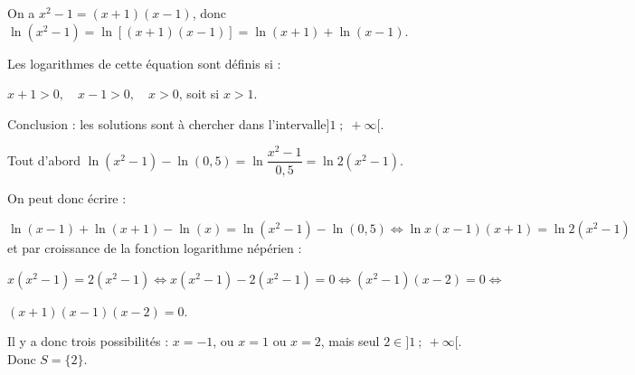 \medskip

On a $x^2 - 1 = (x + 1)(x - 1)$, donc $\ln \left(x^2 - 1\right) = \ln [(x + 1)(x - 1)] = \ln (x + 1) + \ln (x - 1)$.

Les logarithmes de cette équation sont définis si :

$x + 1 > 0, \quad x - 1 > 0, \quad x > 0$, soit si $x > 1$.

Conclusion : les solutions sont à chercher dans l'intervalle$]1\;;\; +\infty[$.

Tout d'abord $\ln \left (x^2-1\right ) - \ln\left (0,5\right ) = \ln \dfrac{x^2 - 1}{0,5} = \ln 2\left(x^2 - 1 \right)$.

On peut donc écrire :

$\ln\left (x - 1\right ) + \ln \left (x + 1\right ) - \ln\left (x\right ) = \ln \left (x^2-1\right ) - \ln\left (0,5\right ) \iff \ln x(x - 1)(x + 1) = \ln 2\left(x^2 - 1 \right)$ et par croissance de la fonction logarithme népérien :

$x\left(x^2 - 1\right)= 2\left(x^2 - 1 \right) \iff  x\left(x^2 - 1\right) - 2\left(x^2 - 1 \right) = 0 \iff \left(x^2 - 1\right)(x - 2) = 0 \iff$

$ (x + 1)(x - 1)(x - 2) = 0$.

Il y a donc trois possibilités : $x = - 1$, ou $x = 1$ ou $x = 2$, mais seul $2 \in ]1~;~+ \infty[$. Donc $S = \{2\}$.

\bigskip
